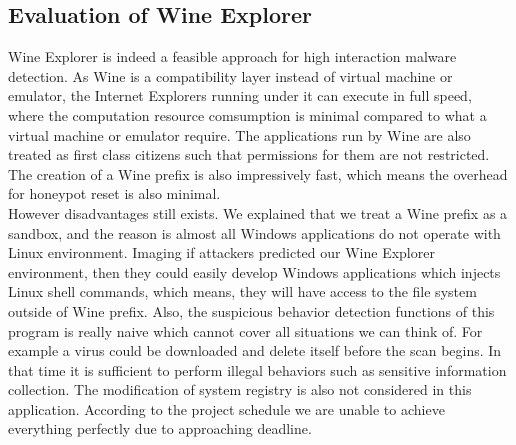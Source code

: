 \subsection{Evaluation of Wine Explorer}
Wine Explorer is indeed a feasible approach for high interaction malware 
detection. As Wine is a compatibility layer instead of virtual machine or 
emulator, the Internet Explorers running under it can execute in full speed, 
where the computation resource comsumption is minimal compared to what 
a virtual machine or emulator require. The applications run by Wine are also 
treated as first class citizens such that permissions for them are not 
restricted. The creation of a Wine prefix is also impressively fast, which 
means the overhead for honeypot reset is also minimal. \\
However disadvantages still exists. We explained that we treat a Wine prefix 
as a sandbox, and the reason is almost all Windows applications do not operate 
with Linux environment. Imaging if attackers predicted our Wine Explorer 
environment, then they could easily develop Windows applications which injects 
Linux shell commands, which means, they will have access to the file system 
outside of Wine prefix. Also, the suspicious behavior detection functions of this 
program is really naive which cannot cover all situations we can think of. For 
example a virus could be downloaded and delete itself before the scan begins. 
In that time it is sufficient to perform illegal behaviors such as sensitive 
information collection. The modification of system 
registry is also not considered in this application. According to the project 
schedule we are unable to achieve everything perfectly due to approaching 
deadline. 
